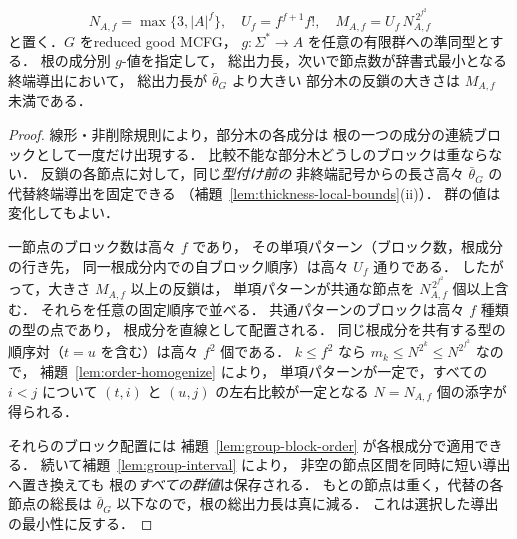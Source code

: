\begin{lemma}[重い部分木の反鎖の一様な短縮]
\label{lem:group-heavy-antichain}
\[
 N_{A,f}=\max\{3,|A|^f\},\quad
 U_f=f^{f+1}f!,\quad
 M_{A,f}=U_f\,N_{A,f}^{\,2^{f^2}}
\]
と置く．$G$ をreduced good MCFG，
$g:\Sigma^*\to A$ を任意の有限群への準同型とする．
根の成分別 $g$-値を指定して，
総出力長，次いで節点数が辞書式最小となる終端導出において，
総出力長が $\bar\theta_G$ より大きい
部分木の反鎖の大きさは $M_{A,f}$ 未満である．
\end{lemma}
\begin{proof}
線形・非削除規則により，部分木の各成分は
根の一つの成分の連続ブロックとして一度だけ出現する．
比較不能な部分木どうしのブロックは重ならない．
反鎖の各節点に対して，同じ\emph{型付け前の}
非終端記号からの長さ高々 $\bar\theta_G$ の
代替終端導出を固定できる
（補題~\ref{lem:thickness-local-bounds}(ii)）．
群の値は変化してもよい．

一節点のブロック数は高々 $f$ であり，
その単項パターン（ブロック数，根成分の行き先，
同一根成分内での自ブロック順序）は高々 $U_f$ 通りである．
したがって，大きさ $M_{A,f}$ 以上の反鎖は，
単項パターンが共通な節点を $N_{A,f}^{\,2^{f^2}}$ 個以上含む．
それらを任意の固定順序で並べる．
共通パターンのブロックは高々 $f$ 種類の型の点であり，
根成分を直線として配置される．
同じ根成分を共有する型の順序対（$t=u$ を含む）は高々 $f^2$ 個である．
$k\le f^2$ なら $m_k\le N^{2^k}\le N^{2^{f^2}}$ なので，
補題~\ref{lem:order-homogenize} により，
単項パターンが一定で，すべての $i<j$ について
$(t,i)$ と $(u,j)$ の左右比較が一定となる
$N=N_{A,f}$ 個の添字が得られる．

それらのブロック配置には
補題~\ref{lem:group-block-order} が各根成分で適用できる．
続いて補題~\ref{lem:group-interval} により，
非空の節点区間を同時に短い導出へ置き換えても
根の\emph{すべての群値}は保存される．
もとの節点は重く，代替の各節点の総長は
$\bar\theta_G$ 以下なので，根の総出力長は真に減る．
これは選択した導出の最小性に反する．
\end{proof}

